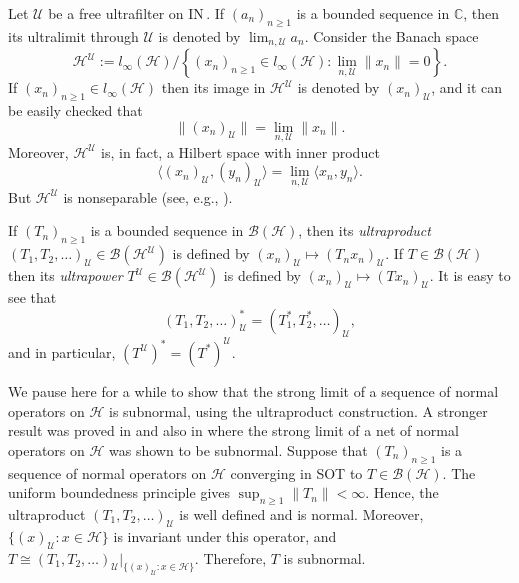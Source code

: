 \documentclass[11pt]{amsart}
\theoremstyle{definition}
\numberwithin{equation}{section}
\begin{document}
Let $\mathscr{U}$ be a free ultrafilter on ${\mathrm{I\!N\!}}\,$. If $(a_{n})_{n\geq 1}$ is a bounded sequence in $\mathbb{C}$, then its ultralimit through $\mathscr{U}$ is denoted by
$\displaystyle\lim_{n,\mathscr{U}}a_{n}$. Consider the Banach space
\[\mathcal{H}^{\mathscr{U}}:=l_{\infty}(\mathcal{H})/\left\{(x_{n})_{n\geq 1}\in l_{\infty}(\mathcal{H}):\lim_{n,\mathscr{U}}\|x_{n}\|=0\right\}.\]
If $(x_{n})_{n\geq 1}\in l_{\infty}(\mathcal{H})$ then its image in $\mathcal{H}^{\mathscr{U}}$ is denoted by $(x_{n})_{\mathscr{U}}$, and it can be easily checked that
\[\|(x_{n})_{\mathscr{U}}\|=\lim_{n,\mathscr{U}}\|x_{n}\|.\]
Moreover, $\mathcal{H}^{\mathscr{U}}$ is, in fact, a Hilbert space with inner product
\[\langle(x_{n})_{\mathscr{U}},(y_{n})_{\mathscr{U}}\rangle=\lim_{n,\mathscr{U}}\langle x_{n},y_{n}\rangle.\]
But $\mathcal{H}^{\mathscr{U}}$ is nonseparable (see, e.g., \cite[Proposition 8.5]{Diestel}).

If $(T_{n})_{n\geq 1}$ is a bounded sequence in $\mathcal{B(H)}$, then its {\it ultraproduct} $(T_{1},T_{2},\ldots)_{\mathscr{U}}\in\mathcal{B}(\mathcal{H}^{\mathscr{U}})$
is defined by $(x_{n})_{\mathscr{U}}\mapsto (T_{n}x_{n})_{\mathscr{U}}$. If $T\in\mathcal{B(H)}$ then its {\it ultrapower} $T^{\mathscr{U}}\in\mathcal{B}(\mathcal{H}^{
\mathscr{U}})$ is defined by $(x_{n})_{\mathscr{U}}\mapsto (Tx_{n})_{\mathscr{U}}$. It is easy to see that
\[(T_{1},T_{2},\ldots)_{\mathscr{U}}^{*}=(T_{1}^{*},T_{2}^{*},\ldots)_{\mathscr{U}},\]
and in particular, $(T^{\mathscr{U}})^{*}=(T^{*})^{\mathscr{U}}$.

We pause here for a while to show that the strong limit of a sequence of normal operators on $\mathcal{H}$ is subnormal, using the ultraproduct construction. A stronger
result was proved in \cite[Theorem 3.3]{Bishop} and also in \cite{Conway} where the strong limit of a net of normal operators on $\mathcal{H}$ was shown to be subnormal.
Suppose that $(T_{n})_{n\geq 1}$ is a sequence of normal operators on $\mathcal{H}$ converging in SOT to $T\in\mathcal{B(H)}$. The uniform boundedness principle gives
$\displaystyle\sup_{n\geq 1}\|T_{n}\|<\infty$. Hence, the ultraproduct $(T_{1},T_{2},\ldots)_{\mathscr{U}}$ is well defined and is normal. Moreover, $\{(x)_{\mathscr{U}}:x
\in\mathcal{H}\}$ is invariant under this operator, and $T\cong(T_{1},T_{2},\ldots)_{\mathscr{U}}|_{\{(x)_{\mathscr{U}}:x\in\mathcal{H}\}}$. Therefore, $T$ is subnormal.
\end{document}
